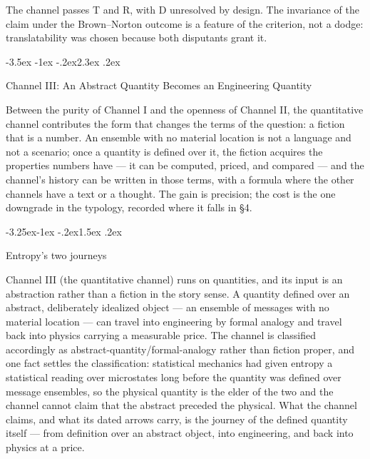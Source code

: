 \documentclass[11pt,a4paper]{article}
\makeatletter
\renewcommand\section{\@startsection{section}{1}{\z@}%
  {-3.5ex \@plus -1ex \@minus -.2ex}{2.3ex \@plus .2ex}%
  {\normalfont\Large\bfseries\raggedright}}
\renewcommand\subsection{\@startsection{subsection}{2}{\z@}%
  {-3.25ex\@plus -1ex \@minus -.2ex}{1.5ex \@plus .2ex}%
  {\normalfont\large\bfseries\raggedright}}
\makeatother
\begin{document}
The channel passes T and R, with D unresolved by design. The invariance of the claim under the Brown–Norton outcome is a feature of the criterion, not a dodge: translatability was chosen because both disputants grant it.

\section{Channel III: An Abstract Quantity Becomes an Engineering Quantity}

Between the purity of Channel I and the openness of Channel II, the quantitative channel contributes the form that changes the terms of the question: a fiction that is a number. An ensemble with no material location is not a language and not a scenario; once a quantity is defined over it, the fiction acquires the properties numbers have --- it can be computed, priced, and compared --- and the channel's history can be written in those terms, with a formula where the other channels have a text or a thought. The gain is precision; the cost is the one downgrade in the typology, recorded where it falls in \S4.

\subsection{Entropy's two journeys}

Channel III (the quantitative channel) runs on quantities, and its input is an abstraction rather than a fiction in the story sense. A quantity defined over an abstract, deliberately idealized object — an ensemble of messages with no material location — can travel into engineering by formal analogy and travel back into physics carrying a measurable price. The channel is classified accordingly as abstract-quantity/formal-analogy rather than fiction proper, and one fact settles the classification: statistical mechanics had given entropy a statistical reading over microstates long before the quantity was defined over message ensembles, so the physical quantity is the elder of the two and the channel cannot claim that the abstract preceded the physical. What the channel claims, and what its dated arrows carry, is the journey of the defined quantity itself — from definition over an abstract object, into engineering, and back into physics at a price.
\end{document}

